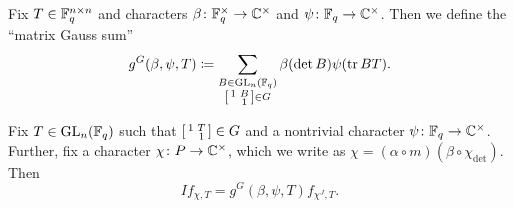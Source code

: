 \begin{definition}
	Fix $T\in \mathbb F_q^{n\times n}$ and characters $\beta\colon\mathbb F_q^\times\to\mathbb C^\times$ and $\psi\colon\mathbb F_q\to\mathbb C^\times$. Then we define the ``matrix Gauss sum''
	\[g^G(\beta,\psi,T)\coloneqq\sum_{\substack{B\in\mathrm{GL}_n(\mathbb F_q)\\\begin{bsmallmatrix}
		1 & B \\ & 1
	\end{bsmallmatrix}\in G}}\beta(\det B)\psi(\operatorname{tr} BT).\]
\end{definition}
\begin{proposition} \label{prop:i-on-psi-eigen}
	Fix $T\in\mathrm{GL}_n(\mathbb F_q)$ such that $\begin{bsmallmatrix}
		1 & T \\ & 1
	\end{bsmallmatrix}\in G$ and a nontrivial character $\psi\colon\mathbb F_q\to\mathbb C^\times$. Further, fix a character $\chi\colon P\to\mathbb C^\times$, which we write as $\chi=(\alpha\circ m)(\beta\circ\chi_{\det})$. Then
	\[If_{\chi,T}=g^G(\beta,\psi,T)f_{\chi^J,T}.\]
\end{proposition}
